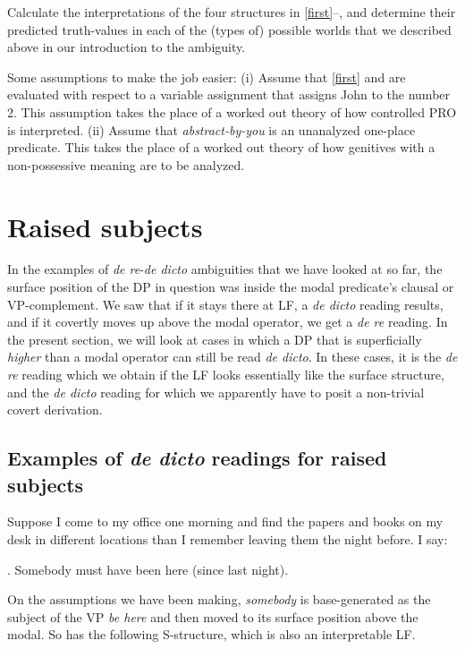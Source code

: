 \begin{exercise}
	
	Calculate the interpretations of the four structures in \ref{first}--\Last, and determine their predicted truth-values in each of the (types of) possible worlds that we described above in our introduction to the ambiguity.
	
	Some assumptions to make the job easier: (i) Assume that \ref{first} and \LLast are evaluated with respect to a variable assignment that assigns John to the number 2. This assumption takes the place of a worked out theory of how controlled PRO is interpreted. (ii) Assume that \emph{abstract-by-you} is an unanalyzed one-place predicate. This takes the place of a worked out theory of how genitives with a non-possessive meaning are to be analyzed. \eex
\end{exercise}

\section{Raised subjects}

In the examples of \emph{de re}-\emph{de dicto} ambiguities that we have looked at so far, the surface position of the DP in question was inside the modal predicate's clausal or VP-complement. We saw that if it stays there at LF, a \emph{de dicto} reading results, and if it covertly moves up above the modal operator, we get a \emph{de re} reading. In the present section, we will look at cases in which a DP that is superficially \emph{higher} than a modal operator can still be read \emph{de dicto}. In these cases, it is the \emph{de re} reading which we obtain if the LF looks essentially like the surface structure, and the \emph{de dicto} reading for which we apparently have to posit a non-trivial covert derivation.

\subsection{Examples of \emph{de dicto} readings for raised subjects}

Suppose I come to my office one morning and find the papers and books on my desk in different locations than I remember leaving them the night before. I say:

\ex. \label{some} Somebody must have been here (since last night).

On the assumptions we have been making, \emph{somebody} is base-generated as the subject of the VP \emph{be here} and then moved to its surface position above the modal. So \Last has the following S-structure, which is also an interpretable LF.

